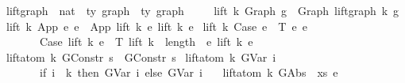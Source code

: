 \begin{isabellebody}
\ lift{\isacharunderscore}{\kern0pt}graph\ {\isacharcolon}{\kern0pt}{\isacharcolon}{\kern0pt}\ {\isachardoublequoteopen}nat\ {\isacharequal}{\kern0pt}{\isachargreater}{\kern0pt}\ {\isacharprime}{\kern0pt}ty\ graph\ {\isacharequal}{\kern0pt}{\isachargreater}{\kern0pt}\ {\isacharprime}{\kern0pt}ty\ graph{\isachardoublequoteclose}\isanewline
{}\isanewline
\ \ \isanewline
\ \ {\isachardoublequoteopen}lift\ k\ {\isacharparenleft}{\kern0pt}Graph\ g{\isacharparenright}{\kern0pt}\ {\isacharequal}{\kern0pt}\ Graph\ {\isacharparenleft}{\kern0pt}lift{\isacharunderscore}{\kern0pt}graph\ k\ g{\isacharparenright}{\kern0pt}{\isachardoublequoteclose}\isanewline
{\isacharbar}{\kern0pt}\ {\isachardoublequoteopen}lift\ k\ {\isacharparenleft}{\kern0pt}App\ e{}\ e{}{\isacharparenright}{\kern0pt}\ {\isacharequal}{\kern0pt}\ App\ {\isacharparenleft}{\kern0pt}lift\ k\ e{}{\isacharparenright}{\kern0pt}\ {\isacharparenleft}{\kern0pt}lift\ k\ e{}{\isacharparenright}{\kern0pt}{\isachardoublequoteclose}\isanewline
{\isacharbar}{\kern0pt}\ {\isachardoublequoteopen}lift\ k\ {\isacharparenleft}{\kern0pt}Case\ e\ {\isasymGamma}\ T\ e{}\ e{}{\isacharparenright}{\kern0pt}\ {\isacharequal}{\kern0pt}\isanewline
\ \ \ \ \ \ \ Case\ {\isacharparenleft}{\kern0pt}lift\ k\ e{\isacharparenright}{\kern0pt}\ {\isasymGamma}\ T\ {\isacharparenleft}{\kern0pt}lift\ {\isacharparenleft}{\kern0pt}k\ {\isacharplus}{\kern0pt}\ length\ {\isasymGamma}{\isacharparenright}{\kern0pt}\ e{}{\isacharparenright}{\kern0pt}\ {\isacharparenleft}{\kern0pt}lift\ k\ e{}{\isacharparenright}{\kern0pt}{\isachardoublequoteclose}\isanewline
\isanewline
\ \ \isanewline
{\isacharbar}{\kern0pt}\ {\isachardoublequoteopen}lift{\isacharunderscore}{\kern0pt}atom\ k\ {\isacharparenleft}{\kern0pt}GConstr\ s{\isacharparenright}{\kern0pt}\ {\isacharequal}{\kern0pt}\ GConstr\ s{\isachardoublequoteclose}\isanewline
{\isacharbar}{\kern0pt}\ {\isachardoublequoteopen}lift{\isacharunderscore}{\kern0pt}atom\ k\ {\isacharparenleft}{\kern0pt}GVar\ i{\isacharparenright}{\kern0pt}\ {\isacharequal}{\kern0pt}\isanewline
\ \ \ \ \ \ \ {\isacharparenleft}{\kern0pt}if\ i\ {\isacharless}{\kern0pt}\ k\ then\ GVar\ i\ else\ GVar\ {\isacharparenleft}{\kern0pt}i\ {\isacharplus}{\kern0pt}\ {}{\isacharparenright}{\kern0pt}{\isacharparenright}{\kern0pt}{\isachardoublequoteclose}\isanewline
{\isacharbar}{\kern0pt}\ {\isachardoublequoteopen}lift{\isacharunderscore}{\kern0pt}atom\ k\ {\isacharparenleft}{\kern0pt}GAbs\ {\isasymtau}\ xs\ e{\isacharparenright}{\kern0pt}\ {\isacharequal}{\kern0pt}\isanewline

\end{isabellebody}
